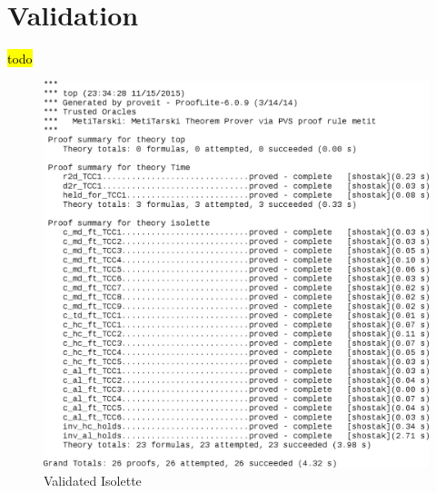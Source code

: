 \documentclass[fontsize=12pt,paper=letter,twoside]{scrartcl}
\begin{document}

\newpage




\newpage



\newpage



\newpage



\newpage
%



\newpage





\section{Validation}
\hl{todo}
\begin{figure}[!htb]
\begin{center}
\includegraphics[width=1\textwidth]{pics/top.png}
\end{center}
\caption{Validated Isolette}
\label{proofs}
\end{figure}
\end{document}
